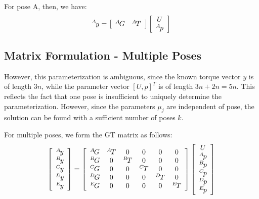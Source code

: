 \documentclass[letterpaper,12pt]{article}
\newcommand{\p}[1]{{}^{#1}\hspace{-.1em}}
\begin{document}
      \noindent
      For pose A, then, we have:
      \begin{equation}
         \p{A}y =
         \left[ \begin{array}{cc}
            \p{A}G & \p{A}T
         \end{array} \right]
         \left[ \begin{array}{c}
            U \\ \p{A}p
         \end{array} \right]
      \end{equation}
      
   \subsection{Matrix Formulation - Multiple Poses}
      
      However, this parameterization is ambiguous, since the known torque
      vector $y$ is of length $3n$,
      while the parameter vector $[ U, p ]^T$
      is of length $3n+2n=5n$.  This reflects the fact
      that one pose is insufficient to uniquely determine the
      parameterization.  However, since the parameters $\mu_j$ are
      independent of pose, the solution can be found with a sufficient
      number of poses $k$.
      
      For multiple poses, we form the GT matrix as follows:
      \begin{equation}
         \left[ \begin{array}{c}
            \p{A}y \\ \p{B}y \\ \p{C}y \\ \p{D}y \\ \p{E}y
         \end{array} \right]
         =
         \left[ \begin{array}{cccccc}
            \p{A}G & \p{A}T &   0 &   0 &   0 &   0 \\
            \p{B}G &   0 & \p{B}T &   0 &   0 &   0 \\
            \p{C}G &   0 &   0 & \p{C}T &   0 &   0 \\
            \p{D}G &   0 &   0 &   0 & \p{D}T &   0 \\
            \p{E}G &   0 &   0 &   0 &   0 & \p{E}T
         \end{array} \right]
         \left[ \begin{array}{c}
            U \\ \p{A}p \\ \p{B}p \\ \p{C}p \\ \p{D}p \\ \p{E}p
         \end{array} \right]
      \end{equation}
      
\end{document}
